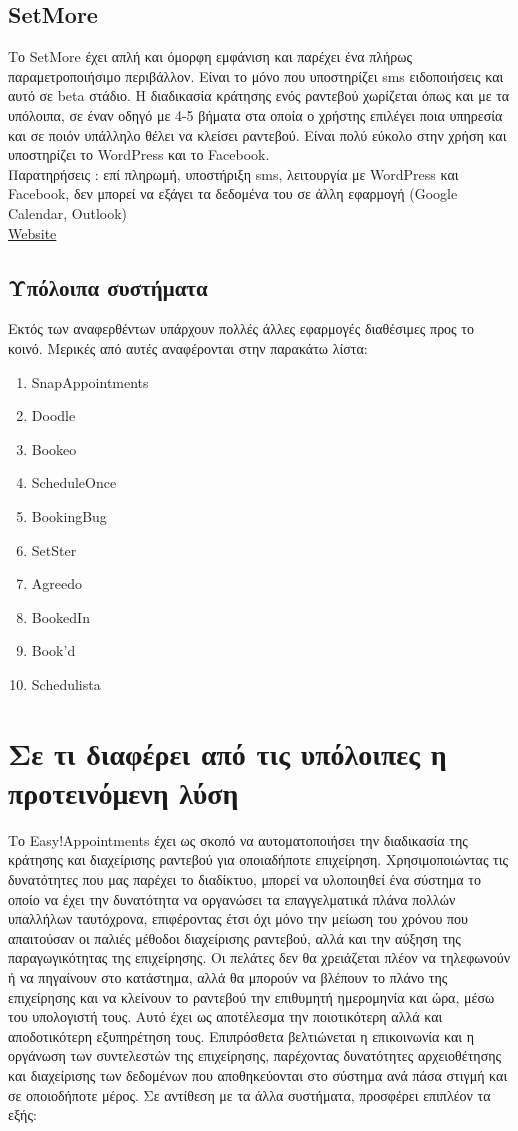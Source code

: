 \documentclass[12pt]{article}
\begin{document}
\subsection{SetMore}
Το SetMore έχει απλή και όμορφη εμφάνιση και παρέχει ένα πλήρως παραμετροποιήσιμο περιβάλλον. Είναι το μόνο που υποστηρίζει sms ειδοποιήσεις και αυτό σε beta στάδιο. Η διαδικασία κράτησης ενός ραντεβού χωρίζεται όπως και με τα υπόλοιπα, σε έναν οδηγό με 4-5 βήματα στα οποία ο χρήστης επιλέγει ποια υπηρεσία και σε ποιόν υπάλληλο θέλει να κλείσει ραντεβού. Είναι πολύ εύκολο στην χρήση και υποστηρίζει το WordPress και το Facebook.
\\[0.3cm]
Παρατηρήσεις : επί πληρωμή, υποστήριξη sms, λειτουργία με WordPress και Facebook, δεν μπορεί να εξάγει τα δεδομένα του σε άλλη εφαρμογή (Google Calendar, Outlook)
\\[0.3cm]
\href{http://www.setmore.com/}{Website}

\subsection{Υπόλοιπα συστήματα}
Εκτός των αναφερθέντων υπάρχουν πολλές άλλες εφαρμογές διαθέσιμες προς το κοινό. Μερικές από αυτές αναφέρονται στην παρακάτω λίστα:
\begin{enumerate}
\item SnapAppointments
\item Doodle
\item Bookeo
\item ScheduleOnce
\item BookingBug
\item SetSter
\item Agreedo
\item BookedIn
\item Book'd
\item Schedulista
\end{enumerate}

\section{Σε τι διαφέρει από τις υπόλοιπες η προτεινόμενη λύση}
Το Easy!Appointments έχει ως σκοπό να αυτοματοποιήσει την διαδικασία της κράτησης και διαχείρισης ραντεβού για οποιαδήποτε επιχείρηση. Χρησιμοποιώντας τις δυνατότητες που μας παρέχει το διαδίκτυο, μπορεί να υλοποιηθεί ένα σύστημα το οποίο να έχει την δυνατότητα να οργανώσει τα επαγγελματικά πλάνα πολλών υπαλλήλων ταυτόχρονα, επιφέροντας έτσι όχι μόνο την μείωση του χρόνου που απαιτούσαν οι παλιές μέθοδοι διαχείρισης ραντεβού, αλλά και την αύξηση της παραγωγικότητας της επιχείρησης. Οι πελάτες δεν θα χρειάζεται πλέον να τηλεφωνούν ή να πηγαίνουν στο κατάστημα, αλλά θα μπορούν να βλέπουν το πλάνο της επιχείρησης και να κλείνουν το ραντεβού την επιθυμητή ημερομηνία και ώρα, μέσω του υπολογιστή τους. Αυτό έχει ως αποτέλεσμα την ποιοτικότερη αλλά και αποδοτικότερη εξυπηρέτηση τους. Επιπρόσθετα βελτιώνεται η επικοινωνία και η οργάνωση των συντελεστών της επιχείρησης, παρέχοντας δυνατότητες αρχειοθέτησης και διαχείρισης των δεδομένων που αποθηκεύονται στο σύστημα ανά πάσα στιγμή και σε οποιοδήποτε μέρος. Σε αντίθεση με τα άλλα συστήματα, προσφέρει επιπλέον τα εξής:
\end{document}
